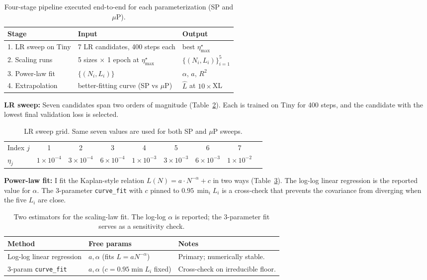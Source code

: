 \documentclass[a4paper]{article}
\begin{document}
\begin{table}[H]
\centering
\small
\begin{tabular}{lll}
\toprule
Stage & Input & Output \\
\midrule
1. LR sweep on Tiny       & 7 LR candidates, 400 steps each & best $\eta_{\max}^\star$ \\
2. Scaling runs           & 5 sizes $\times$ 1 epoch at $\eta_{\max}^\star$ & $\{(N_i, L_i)\}_{i=1}^{5}$ \\
3. Power-law fit          & $\{(N_i, L_i)\}$  & $\alpha$, $a$, $R^2$ \\
4. Extrapolation          & better-fitting curve (SP vs $\mu$P) & $\hat{L}$ at $10{\times}$XL \\
\bottomrule
\end{tabular}
\caption{Four-stage pipeline executed end-to-end for each parameterization (SP and $\mu$P).}
\label{tab:exp_pipeline}
\end{table}

\textbf{LR sweep:} Seven candidates span two orders of magnitude (Table~\ref{tab:lr_grid}). Each is trained on Tiny for 400 steps, and the candidate with the lowest final validation loss is selected.

\begin{table}[H]
\centering
\small
\begin{tabular}{lcccccccc}
\toprule
Index $j$        & 1 & 2 & 3 & 4 & 5 & 6 & 7 \\
$\eta_j$         & $1{\times}10^{-4}$ & $3{\times}10^{-4}$ & $6{\times}10^{-4}$ & $1{\times}10^{-3}$ & $3{\times}10^{-3}$ & $6{\times}10^{-3}$ & $1{\times}10^{-2}$ \\
\bottomrule
\end{tabular}
\caption{LR sweep grid. Same seven values are used for both SP and $\mu$P sweeps.}
\label{tab:lr_grid}
\end{table}

\textbf{Power-law fit:} I fit the Kaplan-style relation $L(N) = a \cdot N^{-\alpha} + c$ in two ways (Table~\ref{tab:fit_methods}). The log-log linear regression is the reported value for $\alpha$. The 3-parameter \texttt{curve\_fit} with $c$ pinned to $0.95\,\min_i L_i$ is a cross-check that prevents the covariance from diverging when the five $L_i$ are close.

\begin{table}[H]
\centering
\small
\begin{tabular}{lll}
\toprule
Method & Free params & Notes \\
\midrule
Log-log linear regression & $a, \alpha$ (fits $L = a N^{-\alpha}$) & Primary; numerically stable. \\
3-param \texttt{curve\_fit} & $a, \alpha$ ($c{=}0.95\min L_i$ fixed) & Cross-check on irreducible floor. \\
\bottomrule
\end{tabular}
\caption{Two estimators for the scaling-law fit. The log-log $\alpha$ is reported; the 3-parameter fit serves as a sensitivity check.}
\label{tab:fit_methods}
\end{table}
\end{document}
